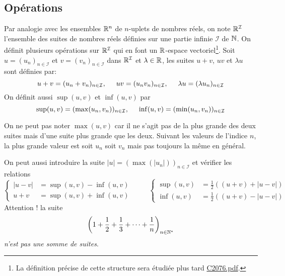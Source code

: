 \subsection{Opérations}
Par analogie avec les ensembles $\mathbb{R}^n$ de $n$-uplets de nombres réels, on note $\mathbb{R}^{\mathcal{I}}$ l'ensemble des suites de nombres réels définies sur une partie infinie $\mathcal{I}$ de $\mathbb{N}$. On définit plusieurs opérations sur $\mathbb{R}^{\mathcal{I}}$ qui en font un $\mathbb{R}$-espace vectoriel\footnote{La définition précise de cette structure sera étudiée plus tard \href{\baseurl C2076.pdf}{\baseurl C2076.pdf}.}.\newline
Soit $u=(u_n)_{n \in \mathcal{I}}$ et $v=(v_n)_{n \in \mathcal{I}}$ dans $\mathbb{R}^{\mathcal{I}}$ et $\lambda \in \mathbb{R}$, les suites $u+v$, $uv$ et $\lambda u$ sont définies par:
\begin{displaymath}
  u+v = (u_n + v_n)_{n \in \mathcal{I}}, \hspace{0.5cm} uv = (u_n  v_n)_{n \in \mathcal{I}}, \hspace{0.5cm} \lambda u = (\lambda u_n)_{n \in \mathcal{I}}
\end{displaymath}
On définit aussi $\sup(u,v)$ et $\inf(u,v)$ par 
\begin{displaymath}
  \sup(u,v) = (\max(u_n , v_n))_{n \in \mathcal{I}}, \hspace{0.5cm} \inf(u,v) = (\min(u_n , v_n))_{n \in \mathcal{I}}
\end{displaymath}
\begin{rem}
  On ne peut pas noter $\max(u,v)$ car il ne s'agit pas de la plus grande des deux suites mais d'une suite plus grande que les deux. Suivant les valeurs de l'indice $n$, la plus grande valeur est soit $u_n$ soit $v_n$ mais pas toujours la même en général.
\end{rem}
On peut aussi introduire la suite $|u| =(\max(|u_n|))_{n \in \mathcal{I}}$ et vérifier les relations
\begin{displaymath}
\left\lbrace  
\begin{aligned}
  |u-v| &= \sup(u,v) - \inf(u,v) \\
  u + v &= \sup(u,v) + \inf(u,v)
\end{aligned}
\right. \hspace{1cm}
\left\lbrace 
\begin{aligned}
  \sup(u,v) &= \frac{1}{2}\left( (u+v) + |u-v|\right) \\ \inf(u,v) &= \frac{1}{2}\left( (u+v) - |u-v|\right) 
\end{aligned}
\right. 
\end{displaymath}
Attention ! la suite
\begin{displaymath}
 \left( 1+ \dfrac{1}{2}+\dfrac{1}{3}+\cdots+\dfrac{1}{n} \right)_{n\in\mathbb{N}^*}
\end{displaymath}
\emph{n'est pas une somme de suites}.

